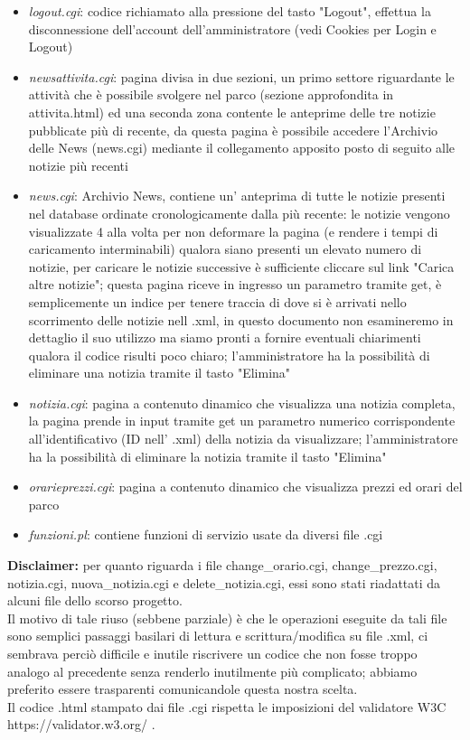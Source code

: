 \documentclass[12pt]{article}
\begin{document}
\begin{itemize}
\item \textit{logout.cgi}: codice richiamato alla pressione del tasto "Logout", effettua la disconnessione dell'account dell'amministratore (vedi Cookies per Login e Logout)
\item \textit{newsattivita.cgi}:  pagina divisa in due sezioni, un primo settore riguardante le attivit\`a che \`e possibile svolgere nel parco (sezione approfondita in attivita.html) ed una seconda zona contente le anteprime delle tre notizie pubblicate pi\`u di recente, da questa pagina \`e possibile accedere l'Archivio delle News (news.cgi) mediante il collegamento apposito posto di seguito alle notizie pi\`u recenti
\item \textit{news.cgi}: Archivio News, contiene un' anteprima di tutte le notizie presenti nel database ordinate cronologicamente dalla pi\`u recente: le notizie vengono visualizzate 4 alla volta per non deformare la pagina (e rendere i tempi di caricamento interminabili) qualora siano presenti un elevato numero di notizie, per caricare le notizie successive \`e sufficiente cliccare sul link "Carica altre notizie"; questa pagina riceve in ingresso un parametro tramite get, \`e semplicemente un indice per tenere traccia di dove si \`e arrivati nello scorrimento delle notizie nell .xml, in questo documento non esamineremo in dettaglio il suo utilizzo ma siamo pronti a fornire eventuali chiarimenti qualora il codice risulti poco chiaro; l'amministratore ha la possibilit\`a di eliminare una notizia tramite il tasto "Elimina"
\item \textit{notizia.cgi}: pagina a contenuto dinamico che visualizza una notizia completa, la pagina prende in input tramite get un parametro numerico corrispondente all'identificativo (ID nell' .xml) della notizia da visualizzare; l'amministratore ha la possibilit\`a di eliminare la notizia tramite il tasto "Elimina"
\item \textit{orarieprezzi.cgi}: pagina a contenuto dinamico che visualizza prezzi ed orari del parco
\item \textit{funzioni.pl}: contiene funzioni di servizio usate da diversi file .cgi
\end{itemize}	

\textbf{Disclaimer:} per quanto riguarda i file change\_orario.cgi, change\_prezzo.cgi, notizia.cgi, nuova\_notizia.cgi e delete\_notizia.cgi, essi sono stati riadattati da alcuni file dello scorso progetto. 
\\ Il motivo di tale riuso (sebbene parziale) \`e che le operazioni eseguite da tali file sono semplici passaggi basilari di lettura e scrittura/modifica su file .xml, ci sembrava perci\`o difficile e inutile riscrivere un codice che non fosse troppo analogo al precedente senza renderlo inutilmente pi\`u complicato; abbiamo preferito essere trasparenti comunicandole questa nostra scelta.\\ Il codice .html stampato dai file .cgi rispetta le imposizioni del validatore W3C https://validator.w3.org/ .
\end{document}

